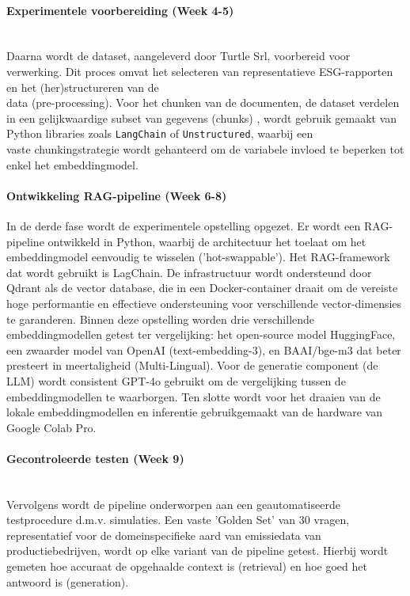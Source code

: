 \paragraph{Experimentele voorbereiding (Week 4-5)}\mbox{}\\
Daarna wordt de dataset, aangeleverd door Turtle Srl, voorbereid voor verwerking. Dit proces omvat het selecteren van representatieve ESG-rapporten en het (her)structureren van de\\data (pre-processing). Voor het chunken van de documenten, de dataset verdelen in een gelijkwaardige subset van gegevens (chunks) \autocite{Dozza2013}, wordt gebruik gemaakt van Python libraries zoals \texttt{LangChain} of \texttt{Unstructured}, waarbij een\\vaste chunkingstrategie wordt gehanteerd om de variabele invloed te beperken tot enkel het embeddingmodel.

\paragraph{Ontwikkeling RAG-pipeline (Week 6-8)}

In de derde fase wordt de experimentele opstelling opgezet. Er wordt een RAG-pipeline ontwikkeld in Python, waarbij de architectuur het toelaat om het embeddingmodel eenvoudig te wisselen ('hot-swappable'). Het RAG-framework dat wordt gebruikt is LagChain. De infrastructuur wordt ondersteund door Qdrant als de vector database, die in een Docker-container draait om de vereiste hoge performantie en effectieve ondersteuning voor verschillende vector-dimensies te garanderen. Binnen deze opstelling worden drie verschillende embeddingmodellen getest ter vergelijking: het open-source model HuggingFace, een zwaarder model van OpenAI (text-embedding-3), en BAAI/bge-m3 dat beter presteert in meertaligheid (Multi-Lingual). Voor de generatie component (de LLM) wordt consistent GPT-4o gebruikt om de vergelijking tussen de embeddingmodellen te waarborgen. Ten slotte wordt voor het draaien van de lokale embeddingmodellen en inferentie gebruikgemaakt van de hardware van Google Colab Pro.

\paragraph{Gecontroleerde testen (Week 9)}\mbox{}\\
Vervolgens wordt de pipeline onderworpen aan een geautomatiseerde testprocedure d.m.v. simulaties. Een vaste 'Golden Set' van 30 vragen, representatief voor de domeinspecifieke aard van emissiedata van productiebedrijven, wordt op elke variant van de pipeline getest. Hierbij wordt gemeten hoe accuraat de opgehaalde context is (retrieval) en hoe goed het antwoord is (generation).

